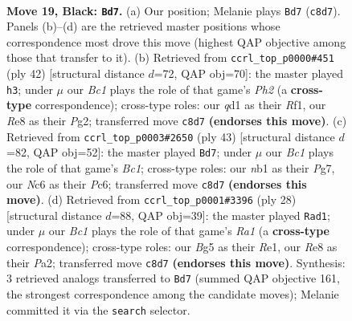 \documentclass[11pt]{article}
\begin{document}
\clearpage

\begin{figure}[p]\centering
\begin{subfigure}{0.46\textwidth}\centering
\resizebox{\linewidth}{!}{%
\newchessgame
\chessboard[
  setfen={r1b1r3/1pp2pkp/2nq4/p2p2b1/3P2P1/NP2P3/P2B1P2/RN1QRK2 b - - 2 19},
  showmover=false,
  pgfstyle=straightmove, color=movearrow, markmove={c8-d7}
]}
\caption{}
\end{subfigure}\hfill
\begin{subfigure}{0.46\textwidth}\centering
\resizebox{\linewidth}{!}{%
\newchessgame
\chessboard[
  setfen={3rnrk1/4qp1p/p1bp2p1/1p6/4PQB1/P1NR4/1PP3PP/5R1K w - - 3 22},
  showmover=false,
  pgfstyle=straightmove, color=movearrow, markmove={h2-h3}
]}
\caption{}
\end{subfigure}
\\[4pt]
\begin{subfigure}{0.46\textwidth}\centering
\resizebox{\linewidth}{!}{%
\newchessgame
\chessboard[
  setfen={r1b1r1k1/1p3pp1/2p4p/p2p3n/3P3q/1P2P2P/P1BQNPP1/4RRK1 b - - 0 22},
  showmover=false,
  pgfstyle=straightmove, color=movearrow, markmove={c8-d7}
]}
\caption{}
\end{subfigure}\hfill
\begin{subfigure}{0.46\textwidth}\centering
\resizebox{\linewidth}{!}{%
\newchessgame
\chessboard[
  setfen={r2qr1k1/p3bpp1/2p1pn1p/3p4/N2P3B/5Q1P/PPP2PP1/R3R1K1 w - - 2 15},
  showmover=false,
  pgfstyle=straightmove, color=movearrow, markmove={a1-d1}
]}
\caption{}
\end{subfigure}
\caption{\textbf{Move 19, Black: \texttt{Bd7}.} (a) Our position; Melanie plays \texttt{Bd7} (\texttt{c8d7}). Panels (b)--(d) are the retrieved master positions whose correspondence most drove this move (highest QAP objective among those that transfer to it). (b) Retrieved from \texttt{ccrl\_top\_p0000\#451} (ply 42) [structural distance $d$=72, QAP obj=70]: the master played \texttt{h3}; under $\mu$ our \emph{Bc1} plays the role of that game's \emph{Ph2} (a \textbf{cross-type} correspondence); cross-type roles: our \emph{q}d1 as their \emph{R}f1, our \emph{R}e8 as their \emph{P}g2; transferred move \texttt{c8d7} \textbf{(endorses this move)}. (c) Retrieved from \texttt{ccrl\_top\_p0003\#2650} (ply 43) [structural distance $d$=82, QAP obj=52]: the master played \texttt{Bd7}; under $\mu$ our \emph{Bc1} plays the role of that game's \emph{Bc1}; cross-type roles: our \emph{n}b1 as their \emph{P}g7, our \emph{N}c6 as their \emph{P}c6; transferred move \texttt{c8d7} \textbf{(endorses this move)}. (d) Retrieved from \texttt{ccrl\_top\_p0001\#3396} (ply 28) [structural distance $d$=88, QAP obj=39]: the master played \texttt{Rad1}; under $\mu$ our \emph{Bc1} plays the role of that game's \emph{Ra1} (a \textbf{cross-type} correspondence); cross-type roles: our \emph{B}g5 as their \emph{R}e1, our \emph{R}e8 as their \emph{P}a2; transferred move \texttt{c8d7} \textbf{(endorses this move)}. Synthesis: 3 retrieved analogs transferred to \texttt{Bd7} (summed QAP objective 161, the strongest correspondence among the candidate moves); Melanie committed it via the \texttt{search} selector.}
\label{fig:thought-m37}
\end{figure}
\end{document}
